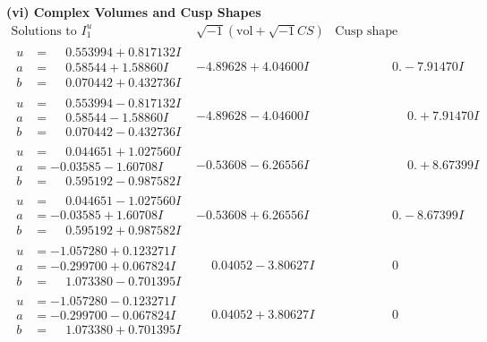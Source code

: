 \documentclass[1p]{elsarticle_modified}
\theoremstyle{definition}
\newcommand{\I}{\sqrt{-1}}
\begin{document}
\newpage\flushleft \textbf{(vi) Complex Volumes and Cusp Shapes}
$$\begin{array}{c|c|c}  
\text{Solutions to }I^u_{1}& \I (\text{vol} + \sqrt{-1}CS) & \text{Cusp shape}\\
 \hline 
\begin{aligned}
u &= \phantom{-}0.553994 + 0.817132 I \\
a &= \phantom{-}0.58544 + 1.58860 I \\
b &= \phantom{-}0.070442 + 0.432736 I\end{aligned}
 & -4.89628 + 4.04600 I & \phantom{-0.000000 } 0. - 7.91470 I \\ \hline\begin{aligned}
u &= \phantom{-}0.553994 - 0.817132 I \\
a &= \phantom{-}0.58544 - 1.58860 I \\
b &= \phantom{-}0.070442 - 0.432736 I\end{aligned}
 & -4.89628 - 4.04600 I & \phantom{-0.000000 -}0. + 7.91470 I \\ \hline\begin{aligned}
u &= \phantom{-}0.044651 + 1.027560 I \\
a &= -0.03585 - 1.60708 I \\
b &= \phantom{-}0.595192 - 0.987582 I\end{aligned}
 & -0.53608 - 6.26556 I & \phantom{-0.000000 -}0. + 8.67399 I \\ \hline\begin{aligned}
u &= \phantom{-}0.044651 - 1.027560 I \\
a &= -0.03585 + 1.60708 I \\
b &= \phantom{-}0.595192 + 0.987582 I\end{aligned}
 & -0.53608 + 6.26556 I & \phantom{-0.000000 } 0. - 8.67399 I \\ \hline\begin{aligned}
u &= -1.057280 + 0.123271 I \\
a &= -0.299700 + 0.067824 I \\
b &= \phantom{-}1.073380 - 0.701395 I\end{aligned}
 & \phantom{-}0.04052 - 3.80627 I & \phantom{-0.000000 } 0 \\ \hline\begin{aligned}
u &= -1.057280 - 0.123271 I \\
a &= -0.299700 - 0.067824 I \\
b &= \phantom{-}1.073380 + 0.701395 I\end{aligned}
 & \phantom{-}0.04052 + 3.80627 I & \phantom{-0.000000 } 0 \\ \hline\begin{aligned}

\end{aligned}
\end{array}$$
\end{document}
